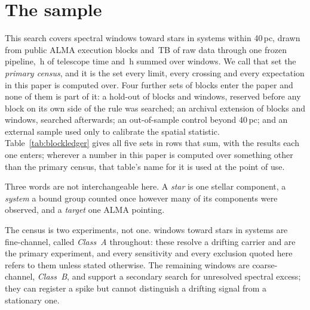 \section{The sample}
\label{sec:sample}

This search covers \NWindows{} spectral windows toward \NStars{}
stars in \NSystems{} systems within 40\,pc, drawn from \NEB{}
public ALMA execution blocks and \TotalDataTB\,TB of raw data through one
frozen pipeline, \StTelHours\,h of telescope time and \LdgCensusHours\,h
summed over windows. We call that set the
\emph{primary census}, and it is the set every limit, every crossing and
every expectation in this paper is computed over. Four further sets of blocks
enter the paper and none of them is part of it: a hold-out of \LdgHoldEB{}
blocks and \LdgHoldWin{} windows, reserved before any block on its own side
of the rule was searched; an archival extension of \LdgExtEB{} blocks and
\LdgExtWin{} windows, searched afterwards; an out-of-sample control beyond
40\,pc; and an external sample used only to calibrate the spatial statistic.
Table~\ref{tab:blockledger} gives all five sets in rows that sum, with the
results each one enters; wherever a number in this paper is computed over
something other than the primary census, that table's name for it is used at
the point of use.

Three words are not interchangeable here. A \emph{star} is one stellar
component, a \emph{system} a bound group counted once however many of its
components were observed, and a \emph{target} one ALMA pointing.

The census is two experiments, not one. \NWinA{} windows toward
\LdgClassAStars{} stars in \NSysClassA{} systems are fine-channel, called
\emph{Class~A} throughout: these resolve a drifting carrier and are the
primary experiment, and every sensitivity and every exclusion quoted here
refers to them unless stated otherwise. The remaining \NWinB{} windows
are coarse-channel, \emph{Class~B}, and support a secondary search for
unresolved spectral excess; they can register a spike but cannot distinguish
a drifting signal from a stationary one.

